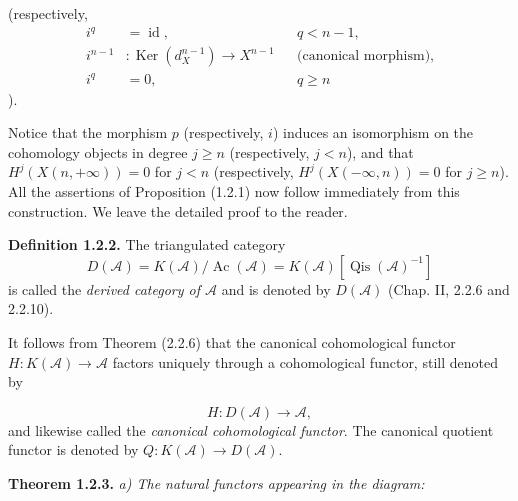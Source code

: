 \clearpage
{}%
\begingroup\small\setlength{\parskip}{0pt}\setlength{\emergencystretch}{1.5em}
\setlength{\abovedisplayskip}{4pt plus 2pt minus 2pt}%
\setlength{\belowdisplayskip}{4pt plus 2pt minus 2pt}%

\noindent(respectively,
\[
\begin{aligned}
i^q&=\operatorname{id},&&q<n-1,\\
i^{n-1}&\colon\operatorname{Ker}(d_X^{n-1})\longrightarrow X^{n-1}
  &&\text{(canonical morphism)},\\
i^q&=0,&&q\geq n
\end{aligned}
\]
).

Notice that the morphism $p$ (respectively, $i$) induces an isomorphism on
the cohomology objects in degree $j\geq n$ (respectively, $j<n$), and that
$H^j(X(n,+\infty))=0$ for $j<n$ (respectively,
$H^j(X(-\infty,n))=0$ for $j\geq n$). All the assertions of Proposition
(1.2.1) now follow immediately from this construction. We leave the
detailed proof to the reader.

\medskip\noindent\textbf{Definition 1.2.2.}\quad
The triangulated category
\[
D(\mathcal A)=K(\mathcal A)/\operatorname{Ac}(\mathcal A)
=K(\mathcal A)[\operatorname{Qis}(\mathcal A)^{-1}]
\]
is called the \emph{derived category of $\mathcal A$} and is denoted by
$D(\mathcal A)$ (Chap. II, 2.2.6 and 2.2.10).

It follows from Theorem (2.2.6) that the canonical cohomological functor
$H\colon K(\mathcal A)\longrightarrow\mathcal A$ factors uniquely through
a cohomological functor, still denoted by

\begin{equation}
H\colon D(\mathcal A)\longrightarrow\mathcal A,
\tag{1.2.2.1}
\end{equation}
and likewise called the \emph{canonical cohomological functor}. The
canonical quotient functor is denoted by
$Q\colon K(\mathcal A)\longrightarrow D(\mathcal A)$.

\medskip\noindent\textbf{Theorem 1.2.3.}\quad
\textit{a) The natural functors appearing in the diagram:}

\begin{center}
\end{center}
\endgroup
